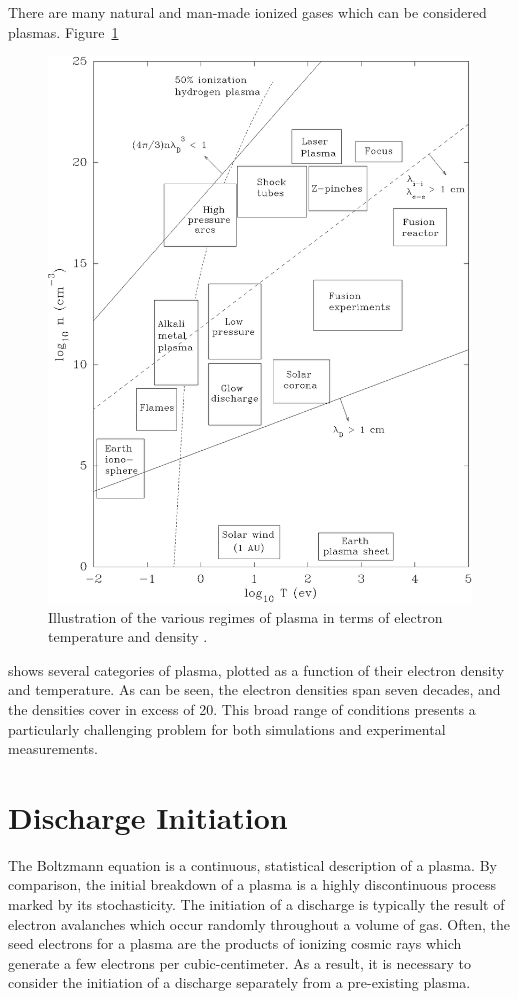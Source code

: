 {There are many natural and man-made ionized gases which can be considered
plasmas. Figure~\ref{fig:regimes}
\begin{figure}
  \centering
  \includegraphics{./chapters/theory/figures/regimes.eps}
  \caption{Illustration of the various regimes of plasma in terms of
electron temperature and density \cite{Huba2011}.}
  \label{fig:regimes}
\end{figure}
shows several categories of plasma, plotted as a function of their electron
density and temperature. As can be seen, the electron densities span seven
decades, and the densities cover in excess of 20. This broad range of conditions
presents a particularly challenging problem for both simulations and
experimental measurements.

\section{Discharge Initiation}
The Boltzmann equation is a continuous, statistical description of a plasma. By
comparison, the initial breakdown of a plasma is a highly discontinuous process
marked by its stochasticity. The initiation of a discharge is typically the
result of electron avalanches which occur randomly throughout a volume of gas.
Often, the seed electrons for a plasma are the products of ionizing cosmic rays
which generate a few electrons per cubic-centimeter. As a result, it is
necessary to consider the initiation of a discharge separately from a
pre-existing plasma.

}
